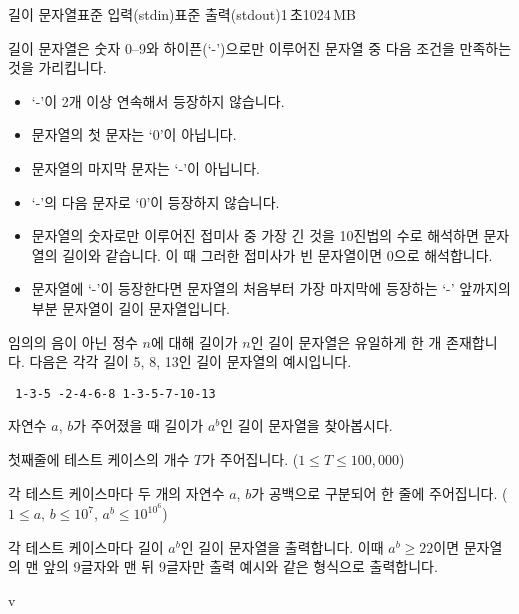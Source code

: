 \begin{problem}{길이 문자열}{표준 입력(stdin)}{표준 출력(stdout)}{1\,초}{1024\,MB}
    
길이 문자열은 숫자 0--9와 하이픈(`-')으로만 이루어진 문자열 중 다음 조건을 만족하는 것을 가리킵니다.

\begin{itemize}
    \item `-'이 2개 이상 연속해서 등장하지 않습니다.
    \item 문자열의 첫 문자는 `0'이 아닙니다.
    \item 문자열의 마지막 문자는 `-'이 아닙니다.
    \item `-'의 다음 문자로 `0'이 등장하지 않습니다.
    \item 문자열의 숫자로만 이루어진 접미사 중 가장 긴 것을 10진법의 수로 해석하면 문자열의 길이와 같습니다. 이 때 그러한 접미사가 빈 문자열이면 0으로 해석합니다.
    \item 문자열에 `-'이 등장한다면 문자열의 처음부터 가장 마지막에 등장하는 `-' 앞까지의 부분 문자열이 길이 문자열입니다.
\end{itemize}

임의의 음이 아닌 정수 $n$에 대해 길이가 $n$인 길이 문자열은 유일하게 한 개 존재합니다. 다음은 각각 길이 5, 8, 13인 길이 문자열의 예시입니다.

\texttt{
1-3-5
-2-4-6-8
1-3-5-7-10-13
}

자연수 $a$, $b$가 주어졌을 때 길이가 $a^b$인 길이 문자열을 찾아봅시다.


\InputFile
첫째줄에 테스트 케이스의 개수 $T$가 주어집니다. ($1 \leq T \leq 100,000$)

각 테스트 케이스마다 두 개의 자연수 $a$, $b$가 공백으로 구분되어 한 줄에 주어집니다. ($1 \leq a,\, b \leq 10^7$, $a^b \leq 10^{10^6}$)


\OutputFile
각 테스트 케이스마다 길이 $a^b$인 길이 문자열을 출력합니다. 이때 $a^b \geq 22$이면 문자열의 맨 앞의 9글자와 맨 뒤 9글자만 출력 예시와 같은 형식으로 출력합니다.

\Examples

\begin{example}
v%
%
\end{example}

\end{problem}
